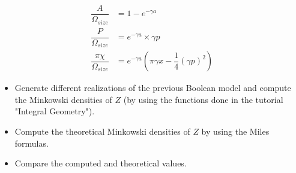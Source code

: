 \begin{align}
\dfrac{A}{\Omega_{size}} & = 1-e^{-\gamma a}\\
\dfrac{P}{\Omega_{size}} & = e^{-\gamma a}\times \gamma p\\
\dfrac{\pi \chi}{\Omega_{size}} & = e^{-\gamma a} \left( \pi\gamma x - \dfrac{1}{4}(\gamma p)^2 \right)
\end{align}
\vspace*{-8pt}
\begin{qbox}
\begin{itemize}
\item Generate different realizations of the previous Boolean model and compute the Minkowski densities of $Z$ (by using the functions done in the tutorial "Integral Geometry").
\item Compute the theoretical Minkowski densities of $Z$ by using the Miles formulas.
\item Compare the computed and theoretical values. 
\end{itemize}
\end{qbox}
